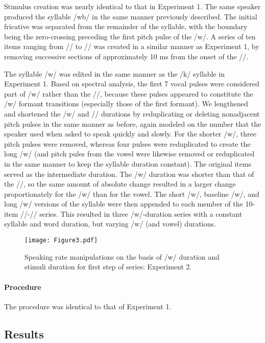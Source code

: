 \documentclass[preprint]{JASA}
\begin{document}
Stimulus creation was nearly identical to that in Experiment 1. The same speaker produced the syllable /\textesh w\textsci b/ in the same manner previously described. The initial fricative was separated from the remainder of the syllable, with the boundary being the zero-crossing preceding the first pitch pulse of the /w/. A series of ten items ranging from /\textesh/ to /\textteshlig/ was created in a similar manner as Experiment 1, by removing successive sections of approximately 10 ms from the onset of the /\textesh/. 

The syllable /w\textsci/ was edited in the same manner as the /k\textscripta/ syllable in Experiment 1. Based on spectral analysis, the first 7 vocal pulses were considered part of /w/ rather than the /\textsci/, because these pulses appeared to constitute the /w/ formant transitions (especially those of the first formant). We lengthened and shortened the /w/ and /\textsci/ durations by reduplicating or deleting nonadjacent pitch pulses in the same manner as before, again modeled on the number that the speaker used when asked to speak quickly and slowly. For the shorter /w/, three pitch pulses were removed, whereas four pulses were reduplicated to create the long /w/ (and pitch pules from the vowel were likewise removed or reduplicated in the same manner to keep the syllable duration constant). The original items served as the intermediate duration. The /w/ duration was shorter than that of the /\textsci/, so the same amount of absolute change resulted in a larger change proportionately for the /w/ than for the vowel. The short /w/, baseline /w/, and long /w/ versions of the syllable were then appended to each member of the 10-item /\textesh/-/\textteshlig/ series. This resulted in three /w/-duration series with a constant syllable and word duration, but varying /w/ (and vowel) durations.

\begin{figure}
\centering
\texttt{[image: Figure3.pdf]}
\caption{\label{fig:schema}} Speaking rate manipulations on the basis of /w/ duration and stimuli duration for first step of series: Experiment 2. 
\end{figure}

\paragraph{Procedure}

The procedure was identical to that of Experiment 1.

\subsection{Results}
\end{document}
